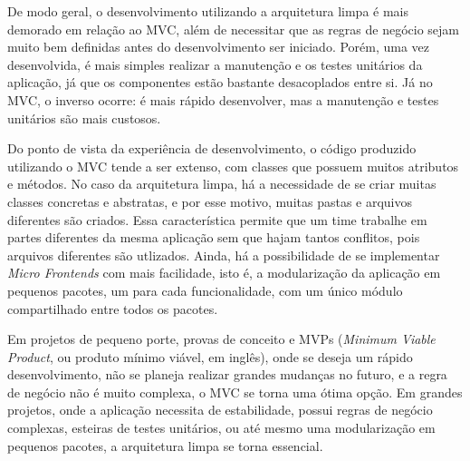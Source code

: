 De modo geral, o desenvolvimento utilizando a arquitetura limpa é mais demorado em relação ao MVC, além de necessitar que as regras de negócio sejam muito bem definidas antes do desenvolvimento ser iniciado.
Porém, uma vez desenvolvida, é mais simples realizar a manutenção e os testes unitários da aplicação, já que os componentes estão bastante desacoplados entre si.
Já no MVC, o inverso ocorre: é mais rápido desenvolver, mas a manutenção e testes unitários são mais custosos.

Do ponto de vista da experiência de desenvolvimento, o código produzido utilizando o MVC tende a ser extenso, com classes que possuem muitos atributos e métodos.
No caso da arquitetura limpa, há a necessidade de se criar muitas classes concretas e abstratas, e por esse motivo, muitas pastas e arquivos diferentes são criados.
Essa característica permite que um time trabalhe em partes diferentes da mesma aplicação sem que hajam tantos conflitos, pois arquivos diferentes são utlizados.
Ainda, há a possibilidade de se implementar \emph{Micro Frontends} com mais facilidade, isto é, a modularização da aplicação em pequenos pacotes, um para cada funcionalidade, com um único módulo compartilhado entre todos os pacotes.

Em projetos de pequeno porte, provas de conceito e MVPs (\emph{Minimum Viable Product}, ou produto mínimo viável, em inglês), onde se deseja um rápido desenvolvimento, não se planeja realizar grandes mudanças no futuro, e a regra de negócio não é muito complexa, o MVC se torna uma ótima opção.
Em grandes projetos, onde a aplicação necessita de estabilidade, possui regras de negócio complexas, esteiras de testes unitários, ou até mesmo uma modularização em pequenos pacotes, a arquitetura limpa se torna essencial.